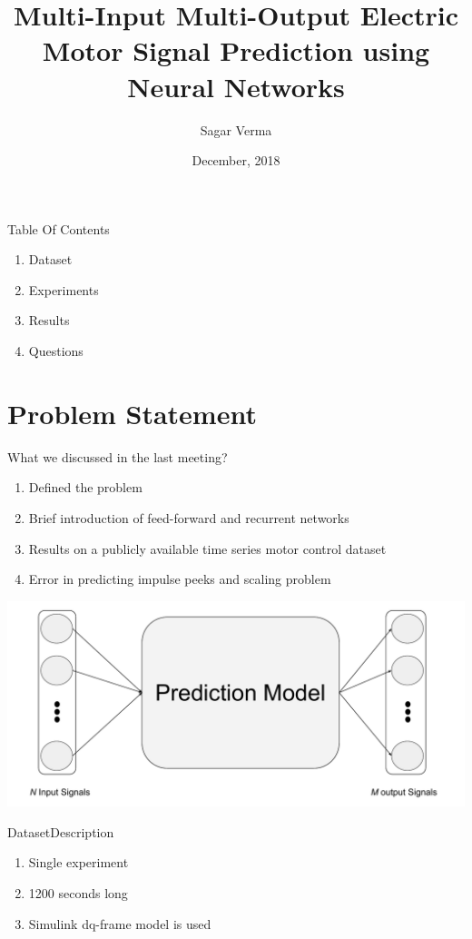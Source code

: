 \documentclass[handout]{beamer}
\title[ \insertdate]{Multi-Input Multi-Output Electric Motor Signal Prediction using Neural Networks}
\author{Sagar Verma}
\institute[Centralesup\'elec and Schneider Electric] %
{
  Centre de Vision Num\'erique,\\
  Centralesup\'elec, Gif-sur-Yvette}
\date{December, 2018}
\begin{document}
\begin{frame}
\titlepage
\end{frame}

\begin{frame}{Table Of Contents}
\begin{enumerate}
\item Dataset
\item Experiments
\item Results
\item Questions
\end{enumerate}
\end{frame}

\section{Problem Statement}

\begin{frame}{What we discussed in the last meeting?}
\begin{center}
\begin{enumerate}
  \item Defined the problem
  \item Brief introduction of feed-forward and recurrent networks
  \item Results on a publicly available time series motor control dataset
  \item Error in predicting impulse peeks and scaling problem
\end{enumerate}
\vspace{.5cm}
\includegraphics[width=1\linewidth]{images/teaser}
\end{center}
\end{frame}


\begin{frame}{Dataset}{Description}
  \begin{enumerate}
    \item Single experiment
    \item 1200 seconds long
    \item Simulink dq-frame model is used
  \end{enumerate}
\end{frame}
\end{document}

